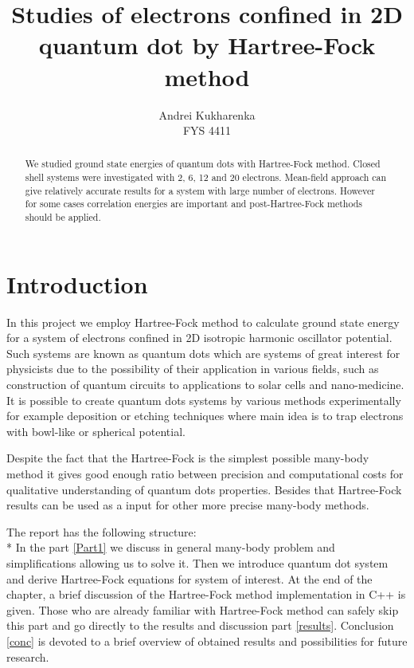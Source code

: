 \documentclass[10pt]{article}
\begin{document}
\setlength\parindent{1pt}
\title{Studies of electrons confined in 2D quantum dot by Hartree-Fock method}
\author{Andrei Kukharenka \\  
FYS 4411 
}

\maketitle
\begin{abstract}
We studied ground state energies of quantum dots with Hartree-Fock method. Closed shell systems were investigated with 2, 6, 12 and 20 electrons. 
Mean-field approach can give relatively accurate results for a system with large number of electrons. However for some cases correlation energies are important and post-Hartree-Fock methods should be applied.  

\end{abstract}







\section{Introduction}


In this project we employ Hartree-Fock method to calculate ground state energy for a system of electrons confined in 2D isotropic harmonic oscillator potential. Such systems are known as quantum dots which are systems of great interest for physicists due to the possibility of their application in various fields, such as construction of quantum circuits to applications to solar cells and nano-medicine. It is possible to create quantum dots systems by various methods experimentally for example deposition or etching\cite{manufacturing} techniques where main idea is to trap electrons  with bowl-like or spherical potential. 

Despite the fact that the Hartree-Fock is the simplest possible many-body method it gives good enough ratio between precision and computational costs for qualitative understanding of quantum dots properties. Besides that Hartree-Fock results can be used as a input for other more precise many-body methods.


The report has the following structure:\\*
In the part \ref{Part1}  we discuss in general many-body problem and simplifications allowing us to solve it. Then we introduce quantum dot system and derive Hartree-Fock equations for system of interest. At the end of the chapter, a brief discussion of the Hartree-Fock method implementation in C++ is given.
Those who are already familiar with Hartree-Fock method can safely skip this part and go directly to the results and discussion part \ref{results}. Conclusion \ref{conc} is devoted to a brief overview of obtained results and possibilities for future research. 
\end{document}
